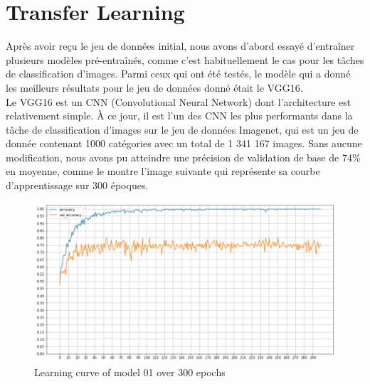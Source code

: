 \documentclass[11pt]{article}
\begin{document}
\section{Transfer Learning}
Après avoir reçu le jeu de données initial, nous avons d'abord essayé
d'entraîner plusieurs modèles pré-entraînés, comme c'est habituellement le cas
pour les tâches de classification d'images. Parmi ceux qui ont été testés, le
modèle qui a donné les meilleurs résultats pour le jeu de données donné était le
VGG16.\\ Le VGG16 est un CNN (Convolutional Neural Network) dont l'architecture
est relativement simple. À ce jour, il est l'un des CNN les plus performants
dans la tâche de classification d'images sur le jeu de données Imagenet, qui est
un jeu de donnée contenant 1000 catégories avec un total de 1 341 167 images. Sans
aucune modification, nous avons pu atteindre une précision de validation de base
de 74\% en moyenne, comme le montre l'image suivante qui représente sa courbe
d'apprentissage sur 300 époques.
\begin{figure}[H]
  \centering
  \includegraphics[scale=0.42]{image/model01.png}
  \caption{Learning curve of model 01 over 300 epochs}
\end{figure}
\end{document}
